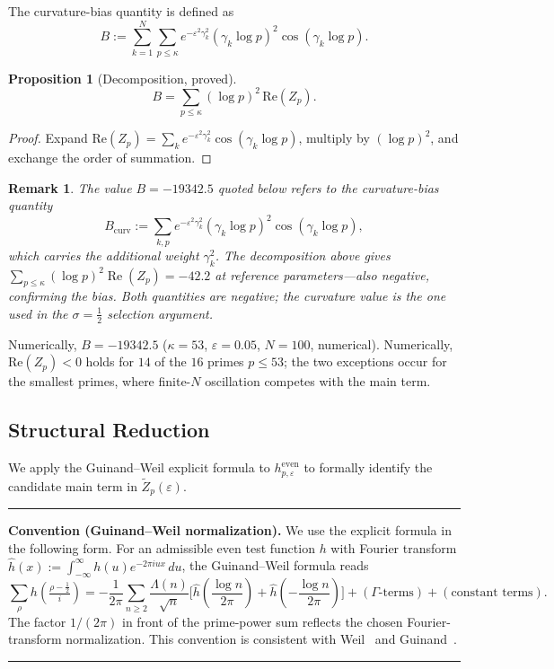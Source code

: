 \documentclass[11pt]{article}
\newtheorem{proposition}[theorem]{Proposition}
\newtheorem*{remark}{Remark}
\newenvironment{conventionbox}{%
  \medskip
  \noindent\rule{\linewidth}{0.4pt}\smallskip\par\noindent
}{%
  \par\smallskip\noindent\rule{\linewidth}{0.4pt}
  \medskip
}
\newcommand{\Zt}{\widetilde{Z}}
\begin{document}
The curvature-bias quantity is defined as
\[
B := \sum_{k=1}^N\sum_{p\leq\kappa}
     e^{-\varepsilon^2\gamma_k^2}(\gamma_k\log p)^2\cos(\gamma_k\log p).
\]

\begin{proposition}[Decomposition, proved]
\label{prop:decomp}
\[
B = \sum_{p\leq\kappa}(\log p)^2\,\mathrm{Re}(Z_p).
\]
\end{proposition}

\begin{proof}
Expand $\mathrm{Re}(Z_p) = \sum_k e^{-\varepsilon^2\gamma_k^2}\cos(\gamma_k\log p)$,
multiply by $(\log p)^2$, and exchange the order of summation.
\end{proof}

\begin{remark}
The value $B = -19342.5$ quoted below refers to the
curvature-bias quantity
\[
  B_{\mathrm{curv}} :=
  \sum_{k,p} e^{-\varepsilon^2\gamma_k^2}
  (\gamma_k\log p)^2\cos(\gamma_k\log p),
\]
which carries the additional weight $\gamma_k^2$.
The decomposition above gives
$\sum_{p\leq\kappa}(\log p)^2\operatorname{Re}(Z_p) = -42.2$
at reference parameters---also negative, confirming the bias.
Both quantities are negative; the curvature value is the
one used in the $\sigma=\tfrac{1}{2}$ selection argument.
\end{remark}

Numerically, $B=-19342.5$ ($\kappa=53$, $\varepsilon=0.05$,
$N=100$, numerical).
Numerically, $\mathrm{Re}(Z_p)<0$ holds for $14$ of the $16$ primes
$p\leq 53$; the two exceptions occur for the smallest primes, where
finite-$N$ oscillation competes with the main term.

\subsection{Structural Reduction}
\label{ssec:reduction}

We apply the Guinand--Weil explicit formula to $h^{\mathrm{even}}_{p,\varepsilon}$
to formally identify the candidate main term in $\Zt_p(\varepsilon)$.

\begin{conventionbox}
\textbf{Convention (Guinand--Weil normalization).}
We use the explicit formula in the following form.
For an admissible even test function $h$ with Fourier transform
$\hat{h}(x) := \int_{-\infty}^\infty h(u)e^{-2\pi i ux}\,du$,
the Guinand--Weil formula reads
\[
\sum_\rho h\!\left(\tfrac{\rho-\frac12}{i}\right)
  = -\frac{1}{2\pi}\sum_{n\geq 2}\frac{\Lambda(n)}{\sqrt{n}}
    \bigl[\hat{h}({\textstyle\frac{\log n}{2\pi}})
          + \hat{h}({-\textstyle\frac{\log n}{2\pi}})\bigr]
  + (\Gamma\text{-terms}) + (\text{constant terms}).
\]
The factor $1/(2\pi)$ in front of the prime-power sum reflects
the chosen Fourier-transform normalization.
This convention is consistent with Weil~\cite{Weil} and
Guinand~\cite{Guinand}.
\end{conventionbox}
\end{document}
